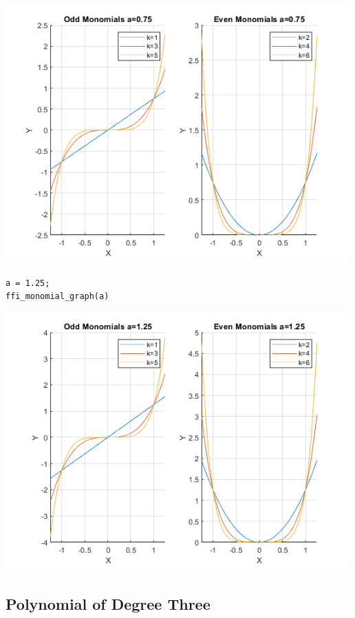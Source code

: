 \documentclass[
]{book}
\begin{document}
\includegraphics[width=5.20833in,height=\textheight]{img/polynomial_images/figure_0.png}

\begin{verbatim}
a = 1.25;
ffi_monomial_graph(a)
\end{verbatim}

\includegraphics[width=5.20833in,height=\textheight]{img/polynomial_images/figure_1.png}

\hypertarget{polynomial-of-degree-three}{%
\subsection{Polynomial of Degree Three}\label{polynomial-of-degree-three}}
\end{document}
